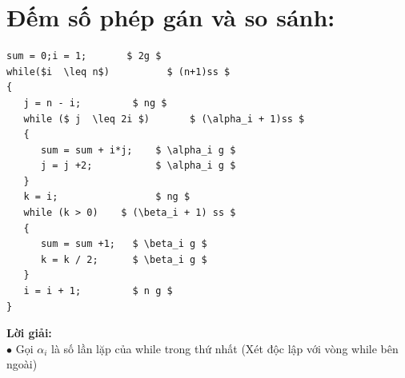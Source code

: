 \documentclass[12pt, letterpaper]{article}
\begin{document}
\section{Đếm số phép gán và so sánh:}
\begin{lstlisting}
sum = 0;i = 1;		 $ 2g $
while($i  \leq n$)			$ (n+1)ss $ 
{    
   j = n - i;		  $ ng $
   while ($ j  \leq 2i $)		$ (\alpha_i + 1)ss $
   {
      sum = sum + i*j;	  $ \alpha_i g $
      j = j +2;           $ \alpha_i g $		
   }
   k = i;             	  $ ng $
   while (k > 0)	$ (\beta_i + 1) ss $
   {
      sum = sum +1;	  $ \beta_i g $
      k = k / 2;	  $ \beta_i g $
   }
   i = i + 1;		  $ n g $
}
	\end{lstlisting}
	\textbf{Lời giải:} \\
	$\bullet$ Gọi $\alpha_i$ là số lần lặp của while trong thứ nhất (Xét độc lập với vòng while bên ngoài)\\
\end{document}
